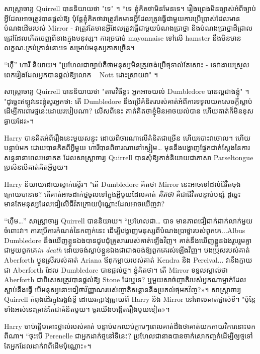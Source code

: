 {សាស្រ្តាចារ្យ Quirrell បាននិយាយថា "ទេ" ។ “ទេ ខ្ញុំគិតថាមិនមែនទេ។ រឿងព្រេងមិនច្បាស់អំពីច្បាប់អ្វីដែលអាចត្រូវបានផ្តល់ឱ្យ ប៉ុន្តែខ្ញុំគិតថាវាត្រូវតែមានអ្វីដែលត្រូវធ្វើជាមួយការប្រើប្រាស់ដែលមានបំណងដើមរបស់ Mirror - វាត្រូវតែមានអ្វីដែលត្រូវធ្វើជាមួយបំណងប្រាថ្នា និងបំណងប្រាថ្នាដ៏ជ្រាលជ្រៅដែលកើតចេញពីខាងក្នុងមនុស្ស។ ការច្របាច់ mayonnaise ទៅលើ hamster នឹងមិនមានលក្ខណៈគ្រប់គ្រាន់នោះទេ សម្រាប់មនុស្សភាគច្រើន។

“ហ៊ឺ” ហារី និយាយ។ "ប្រហែលជាច្បាប់គឺថាមនុស្សមិនត្រូវចង់ប្រើថ្មទាល់តែសោះ - ទេវាងាយស្រួលពេករឿងដែលអ្នកបានផ្តល់ឱ្យលោក ~ Nott ដោះស្រាយវា" ។

សាស្ត្រាចារ្យ Quirrell បាននិយាយថា "តាមវិធីខ្លះ អ្នកអាចយល់ Dumbledore បានល្អជាងខ្ញុំ" ។ "ដូច្នេះឥឡូវនេះខ្ញុំសួរអ្នកថា: តើ Dumbledore នឹងប្រើគំនិតរបស់គាត់អំពីការទទួលយកសេចក្តីស្លាប់ដើម្បីការពារថ្មនេះដោយរបៀបណា? លើសពីនេះ គាត់គិតថាខ្ញុំមិនអាចយល់បាន ហើយគាត់ក៏មិនខុសឆ្ងាយដែរ»។

Harry បានគិតអំពីរឿងនេះមួយសន្ទុះ ដោយពិចារណាលើគំនិតជាច្រើន ហើយបោះវាចោល។ ហើយបន្ទាប់មក ដោយបានគិតពីអ្វីមួយ ហារីបានពិចារណានៅស្ងៀម… មុននឹងបង្ហាញផ្នែកជាក់ស្តែងនៃការសន្ទនានាពេលអនាគត ដែលសាស្រ្តាចារ្យ Quirrell បានសុំឱ្យគាត់និយាយជាភាសា Parseltongue ប្រសិនបើគាត់គិតអ្វីមួយ។

Harry និយាយដោយស្ទាក់ស្ទើរ។ "តើ Dumbledore គិតថា Mirror នេះអាចទៅដល់ជីវិតចុងក្រោយបានទេ? តើគាត់អាចដាក់ថ្មចូលទៅក្នុងអ្វីមួយដែលគាត់ \emph{គិតថា} គឺជាជីវិតបន្ទាប់បន្សំ ដូច្នេះមានតែមនុស្សដែលជឿលើជីវិតក្រោយប៉ុណ្ណោះដែលអាចឃើញវា?

“ហ៊ឹម…” សាស្ត្រាចារ្យ Quirrell បាននិយាយ។ “ប្រហែលជា… បាទ មានភាពជឿជាក់ជាក់លាក់មួយចំពោះវា។ ការប្រើការកំណត់នៃកញ្ចក់នេះ ដើម្បីបង្ហាញមនុស្សពីបំណងប្រាថ្នារបស់ពួកគេ...Albus Dumbledore នឹងឃើញខ្លួនឯងបានជួបជុំគ្រួសាររបស់គាត់ឡើងវិញ។ គាត់នឹងឃើញខ្លួនឯងរួបរួមគ្នាជាមួយពួកគេ\emph{in death} ដោយចង់ស្លាប់ខ្លួនឯងជាជាងចង់ឱ្យពួកគេរស់ឡើងវិញ។ បងប្រុសរបស់គាត់ Aberforth ប្អូនស្រីរបស់គាត់ Ariana ឪពុកម្តាយរបស់គាត់ Kendra និង Percival... វានឹងក្លាយជា Aberforth ដែល Dumbledore បានផ្តល់ថ្ម។ ខ្ញុំគិតថា។ តើ Mirror ទទួលស្គាល់ថា Aberforth ជាពិសេសត្រូវបានផ្តល់ឱ្យ Stone ដែរឬទេ? ឬ​មួយ​សាច់​ញាតិ​របស់​អ្នក​ណា​ម្នាក់​ដែល​ស្លាប់​នឹង​ធ្វើ បើ​មនុស្ស​នោះ​ជឿ​ថា​វិញ្ញាណ​របស់​ញាតិ​សន្ដាន​នឹង​ប្រគល់​ថ្ម​មក​វិញ?»។ សាស្ត្រាចារ្យ Quirrell កំពុងដើរក្នុងរង្វង់ខ្លី ដោយរក្សាឱ្យឆ្ងាយពី Harry និង Mirror នៅពេលគាត់ផ្លាស់ទី។ "ប៉ុន្តែទាំងអស់នេះគ្រាន់តែជាគំនិតមួយ។ ចូរ​យើង​បង្កើត​រឿង​មួយ​ទៀត»។

Harry ចាប់​ផ្តើម​គោះ​ថ្ពាល់​របស់​គាត់ បន្ទាប់​មក​ឈប់​ភ្លាមៗ​ពេល​គាត់​ដឹង​ថា​គាត់​យក​កាយវិការ​នោះ​មក​ពី​ណា។ “ចុះបើ Perenelle ជាអ្នកដាក់ថ្មនៅទីនេះ? ប្រហែល​ជា​នាង​បាន​ចាក់សោ​កញ្ចក់​ដើម្បី​ឲ្យ​ថ្ម​ទៅ​តែ​អ្នក​ដែល​ដាក់​វា​ពី​ដើម​ប៉ុណ្ណោះ»។

}
